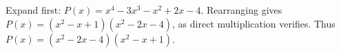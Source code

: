 Expand first: $P(x)=x^4-3x^3-x^2+2x-4$. Rearranging gives $P(x)=(x^2-x+1)(x^2-2x-4)$, as direct multiplication verifies. Thus $\boxed{P(x)=(x^2-2x-4)(x^2-x+1)}$.

